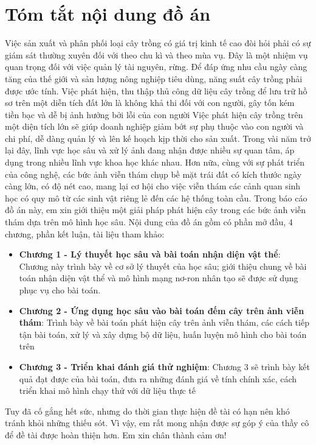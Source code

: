 \documentclass[a4paper, 12pt]{report}
\begin{document}
\chapter*{Tóm tắt nội dung đồ án}
Việc sản xuất và phân phối loại cây trồng có giá trị kinh tế cao đòi hỏi phải có sự giám sát thường xuyên đối với theo chu kì và theo mùa vụ. Đây là một nhiệm vụ quan trọng đối với việc quản lý tài nguyên, rừng. Để đáp ứng nhu cầu ngày càng tăng của thế giới và sản lượng nông nghiệp tiêu dùng, năng suất cây trồng phải được ước tính. Việc phát hiện, thu thập thủ công dữ liệu cây trồng để lưu trữ hồ sơ trên một diễn tích đất lớn là không khả thi đối với con người, gây tốn kém tiền bạc và dễ bị ảnh hưởng bởi lỗi của con người
Việc phát hiện cây trồng trên một diện tích lớn sẽ giúp doanh nghiệp giảm bớt sự phụ thuộc vào con người và chi phí, dễ dàng quản lý và lên kế hoạch kịp thời cho sản xuất. Trong vài năm trở lại đây, lĩnh vực học sâu và xử lý ảnh đang nhận được nhiều sự quan tâm, áp dụng trong nhiều lĩnh vực khoa học khác nhau.  Hơn nữa,  cùng với sự phát triển của công nghệ,  các bức ảnh viễn thám chụp bề mặt trái đất có kích thước ngày càng lớn, có độ nét cao,  mang lại cơ hội cho việc viễn thám các cảnh quan sinh học có quy mô từ các sinh vật riêng lẻ đến các hệ thống toàn cầu. Trong báo cáo đồ án này, em xin giới thiệu một giải pháp phát hiện cây trong các bức ảnh viễn thám dựa trên mô hình học sâu. Nội dung của đồ án gồm có phần mở đầu, 4 chương, phần kết luận, tài liệu tham khảo:
\begin{itemize}
	\item \textbf{Chương 1 -  Lý thuyết học sâu và bài toán nhận diện vật thể}: Chương này trình bày về cơ sở lý thuyết của học sâu; giới thiệu chung về bài toán nhận diện vật thể và mô hình mạng nơ-ron nhân tạo sẽ được sử dụng phục vụ cho bài toán.
	\item \textbf{Chương 2 - Ứng dụng học sâu vào bài toán đếm cây trên ảnh viễn thám}: Trình bày về bài toán phát hiện cây trên ảnh viễn thám,  các cách tiếp tận bài toán, xử lý và xây dựng bộ dữ liệu, huấn luyện mô hình cho bài toán trên
	\item \textbf{Chương 3 -  Triển khai đánh giá thử nghiệm}: Chương 3 sẽ trình bày kết quả đạt được của bài toán, đưa ra những đánh giá về tính chính xác, cách triển khai mô hình chạy thử với dữ liệu  thực tế
\end{itemize}
Tuy đã cố gắng hết sức, nhưng do thời gian thực hiện đề tài có hạn nên khó tránh khỏi những thiếu sót. Vì vậy, em rất mong nhận được sự góp ý của thầy cô để đề tài được hoàn thiện hơn. Em xin chân thành cảm ơn!
\end{document}
